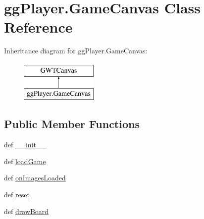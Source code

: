 \hypertarget{classgg_player_1_1_game_canvas}{\section{gg\-Player.\-Game\-Canvas Class Reference}
\label{classgg_player_1_1_game_canvas}
}
Inheritance diagram for gg\-Player.\-Game\-Canvas\-:\begin{figure}[H]
\begin{center}
\leavevmode
\includegraphics[height=2.000000cm]{classgg_player_1_1_game_canvas}
\end{center}
\end{figure}
\subsection*{Public Member Functions}
\begin{DoxyCompactItemize}
\item 
def \hyperlink{classgg_player_1_1_game_canvas_ac35576177ebfe767f36defa0860f0c7c}{\-\_\-\-\_\-init\-\_\-\-\_\-}
\item 
def \hyperlink{classgg_player_1_1_game_canvas_aefb06840926a20f3cc47c23f18aee269}{load\-Game}
\item 
def \hyperlink{classgg_player_1_1_game_canvas_a7389e112bc0cab38e3cbe836dd65004b}{on\-Images\-Loaded}
\item 
def \hyperlink{classgg_player_1_1_game_canvas_ad4261b18fb7ef9fa0e4b2c8b6b1c0a6f}{reset}
\item 
def \hyperlink{classgg_player_1_1_game_canvas_a49a36f712bddfe3ec15b4002560f027d}{draw\-Board}
\end{DoxyCompactItemize}
